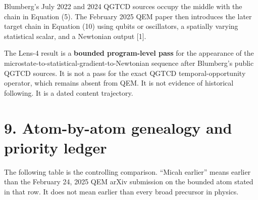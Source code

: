 \documentclass[
  american,
  11pt,
  letterpaper,
]{article}
\begin{document}
Blumberg's July 2022 and 2024 QGTCD sources occupy the middle with the chain in Equation (5). The February 2025 QEM paper then introduces the later target chain in Equation (10) using qubits or oscillators, a spatially varying statistical scalar, and a Newtonian output {[}1{]}.

The Lens-4 result is a \textbf{bounded program-level pass} for the appearance of the microstate-to-statistical-gradient-to-Newtonian sequence after Blumberg's public QGTCD sources. It is not a pass for the exact QGTCD temporal-opportunity operator, which remains absent from QEM. It is not evidence of historical following. It is a dated content trajectory.

\section{9. Atom-by-atom genealogy and priority ledger}\label{atom-by-atom-genealogy-and-priority-ledger}

The following table is the controlling comparison. ``Micah earlier'' means earlier than the February 24, 2025 QEM arXiv submission on the bounded atom stated in that row. It does not mean earlier than every broad precursor in physics.
\end{document}
